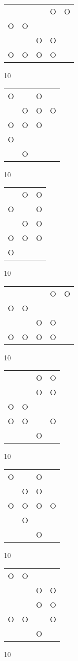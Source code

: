 \begin{tabular}{|m{0.2cm}m{0.2cm}m{0.2cm}m{0.2cm}m{0.2cm}|}\hline
 & & &O&O\\
O&O& & & \\
 & &O&O& \\
O&O&O&O& \\
\hline\end{tabular}10
\begin{tabular}{|m{0.2cm}m{0.2cm}m{0.2cm}m{0.2cm}|}\hline
O& &O& \\
 &O&O&O\\
O&O&O& \\
O& & & \\
 &O& & \\
\hline\end{tabular}10
\begin{tabular}{|m{0.2cm}m{0.2cm}m{0.2cm}|}\hline
 &O&O\\
O& &O\\
 &O&O\\
O&O&O\\
O& & \\
\hline\end{tabular}10
\begin{tabular}{|m{0.2cm}m{0.2cm}m{0.2cm}m{0.2cm}m{0.2cm}|}\hline
 & & &O&O\\
O&O& & & \\
 & &O&O& \\
O&O&O&O& \\
\hline\end{tabular}10
\begin{tabular}{|m{0.2cm}m{0.2cm}m{0.2cm}m{0.2cm}|}\hline
 & &O&O\\
 & &O&O\\
O&O& & \\
O&O& &O\\
 & &O& \\
\hline\end{tabular}10
\begin{tabular}{|m{0.2cm}m{0.2cm}m{0.2cm}m{0.2cm}|}\hline
O& &O& \\
 &O&O& \\
O&O&O&O\\
 &O& & \\
 & &O& \\
\hline\end{tabular}10
\begin{tabular}{|m{0.2cm}m{0.2cm}m{0.2cm}m{0.2cm}|}\hline
O&O& & \\
 & &O&O\\
 & &O&O\\
O&O& &O\\
 & &O& \\
\hline\end{tabular}10
